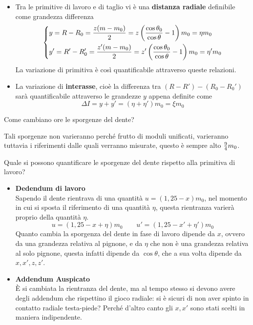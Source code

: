 \documentclass[a4paper, 15pt]{article}
\begin{document}
\begin{adjustwidth}{2in}{}
\begin{itemize}
				\item Tra le primitive di lavoro e di taglio vi è una \textbf{distanza radiale} definibile come grandezza differenza
				\[\begin{dcases}
					y = R-R_0 = \dfrac{z(m-m_0)}{2} = z \left(\dfrac{\cos\theta_0}{\cos\theta} - 1\right) m_0 = \eta m_0 \\										
					y' = R'-R'_0 = \dfrac{z'(m-m_0)}{2} = z' \left(\dfrac{\cos\theta_0}{\cos\theta} - 1\right) m_0 = \eta' m_0
				\end{dcases}\]
				La variazione di primitiva è così quantificabile attraverso queste relazioni. 
				\item La variazione di \textbf{interasse}, cioè la differenza tra $(R-R') - (R_0-R_0')$ sarà quantificabile attraverso le grandezze $y$ appena definite come 
				\[\Delta I = y + y' = (\eta + \eta')m_0 = \xi m_0\]				
				\end{itemize}
				\vspace{0.5cm}
				
				Come cambiano ore le sporgenze del dente? 
				
				Tali sporgenze non varieranno perché frutto di moduli unificati, varieranno tuttavia i riferimenti dalle quali verranno misurate, questo è sempre alto ${9\over4}m_0$. 
				
				Quale si possono quantificare le sporgenze del dente rispetto alla primitiva di lavoro?
				\begin{itemize}
					\item \textbf{Dedendum di lavoro} \\
					Sapendo il dente rientrava di una quantità $u = (1,25 - x)m_0$, nel  momento in cui si sposta il riferimento di una quantità $\eta$, questa rientranza varierà proprio della quantità $\eta$. 
					\[u = (1,25 - x+\eta)m_0 \qquad u' = (1,25 - x'+\eta')m_0\]
					Quanto cambia la sporgenza del dente in fase di lavoro dipende da $x$, ovvero da una grandezza relativa al pignone, e da $\eta$ che non è una grandezza relativa al solo pignone, questa infatti dipende da $\cos\theta$, che a sua volta dipende da $x, x', z, z'$. 
					
					\item \textbf{Addendum Auspicato}\\
					È si cambiata la rientranza del dente, ma al tempo stesso si devono avere degli addendum che rispettino il gioco radiale: si è sicuri di non aver spinto in contatto radiale testa-piede? Perché d'altro canto gli $x, x'$ sono stati scelti in maniera indipendente. 
					

\end{itemize}
\end{adjustwidth}
\end{document}
